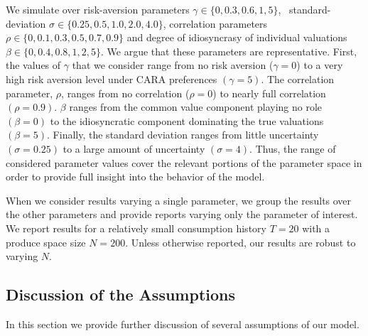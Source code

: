 \documentclass[format=acmsmall, review=false]{acmart}
\begin{document}
We simulate over risk-aversion parameters $\gamma \in \{ 0, 0.3, 0.6, 1, 5 \}$, \ standard-deviation $\sigma \in \{ 0.25, 0.5, 1.0, 2.0, 4.0 \}$, correlation parameters $\rho\in \{ 0, 0.1, 0.3, 0.5, 0.7, 0.9 \} $ and degree of idiosyncrasy of individual valuations $\beta \in \{ 0, 0.4, 0.8, 1, 2, 5\}$. We argue that these parameters are representative. First, the values of $\gamma$ that we consider range from no risk aversion ($\gamma = 0$) to a very high risk aversion level under CARA preferences $(\gamma = 5)$. The correlation parameter, $\rho$, ranges from no correlation ($\rho = 0$) to nearly full correlation $(\rho = 0.9)$. $\beta$ ranges from the common value component playing no role $(\beta = 0)$ to the idiosyncratic component dominating the true valuations $(\beta = 5)$. Finally, the standard deviation ranges from little uncertainty $(\sigma = 0.25)$ to a large amount of uncertainty $(\sigma = 4)$. Thus, the range of considered parameter values cover the relevant portions of the parameter space in order to provide full insight into the behavior of the model. 
\par
When we consider results varying a single parameter, we group the results over the other parameters and provide reports varying only the parameter of interest. We report results for a relatively small consumption history $T=20$ with a produce space size $N=200$. Unless otherwise reported, our results are robust to varying $N$.


\subsection{Discussion of the Assumptions}
In this section we provide further discussion of several assumptions of our model.
\par
\end{document}
